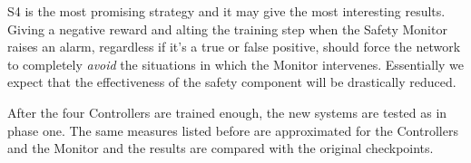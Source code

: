 S4 is the most promising strategy and it may give the most interesting results. Giving a negative reward and alting the training step when the Safety Monitor raises an alarm, regardless if it's a true or false positive, should force the network to completely \textsl{avoid} the situations in which the Monitor intervenes. Essentially we expect that the effectiveness of the safety component will be drastically reduced.\newline

After the four Controllers are trained enough, the new systems are tested as in phase one. The same measures listed before are approximated for the Controllers and the Monitor and the results are compared with the original checkpoints.

